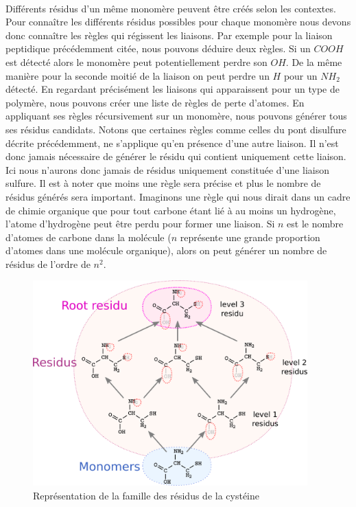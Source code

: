 \documentclass[12pt,french,twoside]{report}
\begin{document}
\paragraph{}Différents résidus d'un même monomère peuvent être créés selon les contextes. Pour connaître les différents résidus
possibles pour chaque monomère nous devons donc connaître les règles qui régissent les liaisons. Par exemple pour la liaison
peptidique précédemment citée, nous pouvons déduire deux règles. Si un $COOH$ est détecté alors le monomère peut potentiellement
perdre son $OH$. De la même manière pour la seconde moitié de la liaison on peut perdre un $H$ pour un $NH_2$ détecté. En
regardant précisément les liaisons qui apparaissent pour un type de polymère, nous pouvons créer une liste de règles de perte
d'atomes. En appliquant ses règles récursivement sur un monomère, nous pouvons générer tous ses résidus candidats. Notons que
certaines règles comme celles du pont disulfure décrite précédemment, ne s'applique qu'en présence d'une autre liaison. Il n'est
donc jamais nécessaire de générer le résidu qui contient uniquement cette liaison. Ici nous n'aurons donc jamais de résidus
uniquement constituée d'une liaison sulfure. Il est
à noter que moins une règle sera précise et plus le nombre de résidus générés sera important. Imaginons une règle qui nous dirait
dans un cadre de chimie organique que pour tout carbone étant lié à au moins un hydrogène, l'atome d'hydrogène peut être perdu
pour former une liaison. Si $n$ est le nombre d'atomes de carbone dans la molécule ($n$ représente une grande proportion d'atomes
dans une molécule organique), alors on peut générer un nombre de résidus de l'ordre de $n^2$.

\begin{figure}
  \begin{center}
    \includegraphics[width=400px]{Figures/s2m/residues/cystein_family.png}
    \caption{\label{sulfure}Représentation de la famille des résidus de la cystéine}
  \end{center}
\end{figure}
\end{document}
